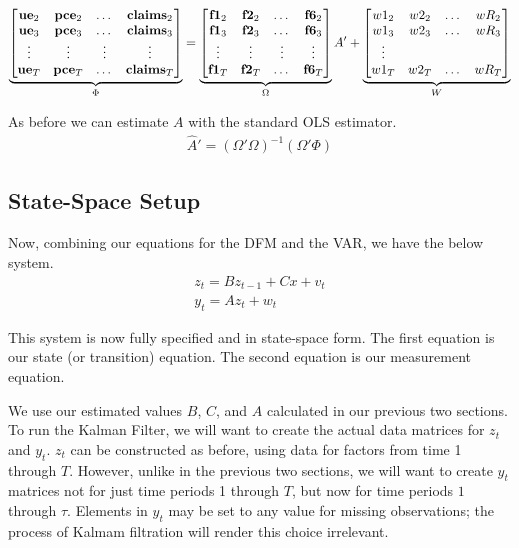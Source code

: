 \documentclass[11pt, letterpaper]{article}\usepackage[]{graphicx}\usepackage[]{color}
\newcommand{\vv}[1]{\textcolor{black}{\mathbf{#1}}}
\begin{document}
\begin{equation}
\underbrace{\begin{bmatrix}
\vv{ue}_{2} & \vv{pce}_{2} & \dots & \vv{claims}_{2}\\
\vv{ue}_{3} & \vv{pce}_{3} & \dots & \vv{claims}_{3}\\
\vdots & \vdots & \vdots & \vdots \\
\vv{ue}_{T} & \vv{pce}_{T} & \dots & \vv{claims}_{T}\\
\end{bmatrix}}_{\Phi}
=
\underbrace{\begin{bmatrix}
\vv{f1}_{2} & \vv{f2}_{2} & \dots & \vv{f6}_{2}\\
\vv{f1}_{3} & \vv{f2}_{3} & \dots & \vv{f6}_{3}\\
\vdots & \vdots & \vdots & \vdots \\
\vv{f1}_{T} & \vv{f2}_{T} & \dots & \vv{f6}_{T}\\
\end{bmatrix}}_{\Omega}
A'
 +
\underbrace{\begin{bmatrix}
w1_2 & w2_2 & \dots & wR_2\\
w1_3 & w2_3 & \dots & wR_3\\
\vdots\\
w1_T & w2_T & \dots & wR_T\\
\end{bmatrix}}_{W}
\end{equation}

As before we can estimate $A$ with the standard OLS estimator.
\begin{align*}
\widehat{A}' = (\Omega' \Omega)^{-1} (\Omega'\Phi)
\end{align*}


\subsection{State-Space Setup}
Now, combining our equations for the DFM and the VAR, we have the below system.
\begin{align*}
z_t = B z_{t-1} + Cx + v_t\\
y_t = A z_t + w_t
\end{align*}

This system is now fully specified and in state-space form. The first equation is our state (or transition) equation. The second equation is our measurement equation. 

We use our estimated values $B$, $C$, and $A$ calculated in our previous two sections. To run the Kalman Filter, we will want to create the actual data matrices for $z_t$ and $y_t$. $z_t$ can be constructed as before, using data for factors from time 1 through $T$. However, unlike in the previous two sections, we will want to create $y_t$ matrices not for just time periods 1 through $T$, but now for time periods $1$ through $\tau$. Elements in $y_t$ may be set to any value for missing observations; the process of Kalmam filtration will render this choice irrelevant.
\end{document}
